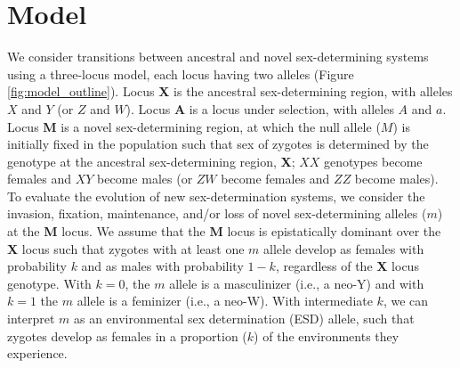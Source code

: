 \documentclass[10pt,letterpaper]{article}
\begin{document}


\section*{Model}

We consider transitions between ancestral and novel sex-determining systems using a three-locus model, each locus having two alleles (Figure \ref{fig:model_outline}). 
Locus \textbf{X} is the ancestral sex-determining region, with alleles $X$ and $Y$ (or $Z$ and $W$).
Locus \textbf{A} is a locus under selection, with alleles $A$ and $a$.
Locus \textbf{M} is a novel sex-determining region, at which the null allele ($M$) is initially fixed in the population such that sex of zygotes is determined by the genotype at the ancestral sex-determining region, \textbf{X}; $XX$ genotypes become females and $XY$ become males (or $ZW$ become females and $ZZ$ become males). 
To evaluate the evolution of new sex-determination systems, we consider the invasion, fixation, maintenance, and/or loss of novel sex-determining alleles ($m$) at the \textbf{M} locus. 
We assume that the \textbf{M} locus is epistatically dominant over the \textbf{X} locus such that zygotes with at least one $m$ allele develop as females with probability $k$ and as males with probability $1-k$, regardless of the \textbf{X} locus genotype.
With $k=0$, the $m$ allele is a masculinizer (i.e., a neo-Y) and with $k=1$ the $m$ allele is a feminizer (i.e., a neo-W).
With intermediate $k$, we can interpret $m$ as an environmental sex determination (ESD) allele, such that zygotes develop as females in a proportion ($k$) of the environments they experience. 
\end{document}
